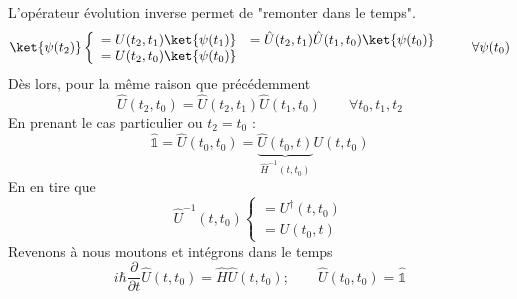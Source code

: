 	L'opérateur évolution inverse permet de "remonter dans le temps". 
	\begin{equation}
	\ket{\psi(t_2)} \left\{\begin{array}{ll}
	= U(t_2,t_1)\ket{\psi(t_1)} &= \hat{U}(t_2,t_1)\hat{U}(t_1,t_0)\ket{\psi(t_0)}\\
	= U(t_2,t_0)\ket{\psi(t_0)}
	\end{array}\right.\qquad \forall \psi(t_0)
	\end{equation}
	Dès lors, pour la même raison que précédemment
	\begin{equation}
	\hat U(t_2,t_0) = \hat{U}(t_2,t_1)\hat{U}(t_1,t_0)\qquad \forall t_0,t_1,t_2
	\end{equation}
	En prenant le cas particulier ou $t_2=t_0$ :
	\begin{equation}
	\hat{\mathbb{1}} = \hat{U}(t_0,t_0) = \underbrace{\hat{U}(t_0,t)}_{\hat{H}^{-1}(t,t_0)}U(t,t_0)
	\end{equation}
	En en tire que
	\begin{equation}
	\hat{U}^{-1}(t,t_0) \left\{\begin{array}{ll}
	= U^\dagger (t,t_0)\\
	= U(t_0,t)
	\end{array}\right.
	\end{equation}
	Revenons à nous moutons et intégrons dans le temps
	\begin{equation}
	i\hbar \dfrac{\partial}{\partial t}\hat{U}(t,t_0) = \hat{H}\hat{U}(t,t_0) ;\qquad \hat{U}(t_0,t_0) = 
	\hat{\mathbb{1}}
	\end{equation}
	
